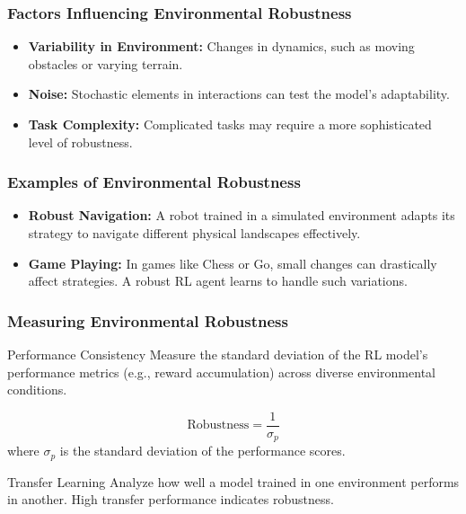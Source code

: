 \documentclass{beamer}
\begin{document}
\begin{frame}[fragile]
    \frametitle{Factors Influencing Environmental Robustness}
    \begin{itemize}
        \item \textbf{Variability in Environment:} Changes in dynamics, such as moving obstacles or varying terrain.
        \item \textbf{Noise:} Stochastic elements in interactions can test the model's adaptability.
        \item \textbf{Task Complexity:} Complicated tasks may require a more sophisticated level of robustness.
    \end{itemize}
\end{frame}

\begin{frame}[fragile]
    \frametitle{Examples of Environmental Robustness}
    \begin{itemize}
        \item \textbf{Robust Navigation:} A robot trained in a simulated environment adapts its strategy to navigate different physical landscapes effectively.
        \item \textbf{Game Playing:} In games like Chess or Go, small changes can drastically affect strategies. A robust RL agent learns to handle such variations.
    \end{itemize}
\end{frame}

\begin{frame}[fragile]
    \frametitle{Measuring Environmental Robustness}
    \begin{block}{Performance Consistency}
        Measure the standard deviation of the RL model’s performance metrics (e.g., reward accumulation) across diverse environmental conditions.
        
        \begin{equation}
            \text{Robustness} = \frac{1}{\sigma_{p}}
        \end{equation}
        where $\sigma_{p}$ is the standard deviation of the performance scores.
    \end{block}
    
    \begin{block}{Transfer Learning}
        Analyze how well a model trained in one environment performs in another. High transfer performance indicates robustness.
    \end{block}
\end{frame}
\end{document}
